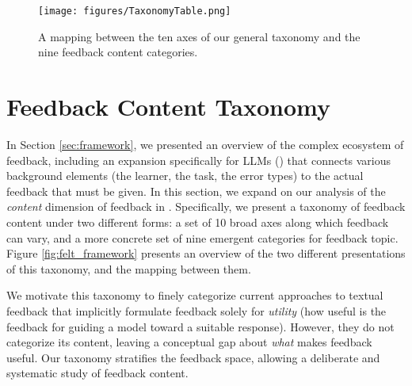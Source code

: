 \begin{figure*}[ht]
\center
\texttt{[image: figures/TaxonomyTable.png]}
\caption{A mapping between the ten axes of our general taxonomy and the nine feedback content categories.}
\label{fig:taxonomy}
\end{figure*}

\section{Feedback Content Taxonomy}
\label{sec:taxonomy}

In Section \ref{sec:framework}, we presented an overview of the complex ecosystem of feedback, including an expansion specifically for LLMs (\ie \ours) that connects various background elements (\eg the learner, the task, the error types) to the actual feedback that must be given. In this section, we expand on our analysis of the \textit{content} dimension of feedback in \ours. 
Specifically, we present a taxonomy of feedback content under two different forms: a set of 10 broad axes along which feedback can vary, and a more concrete set of nine emergent categories for feedback topic. 
Figure \ref{fig:felt_framework} presents an overview of the two different presentations of this taxonomy, and the mapping between them.

We motivate this taxonomy to finely categorize current approaches to textual feedback that implicitly formulate feedback solely for \textit{utility} (\ie how useful is the feedback for guiding a model toward a suitable response). However, they do not categorize its content, leaving a conceptual gap about \textit{what} makes feedback useful. 
Our taxonomy stratifies the feedback space, allowing a deliberate and systematic study of feedback content.


